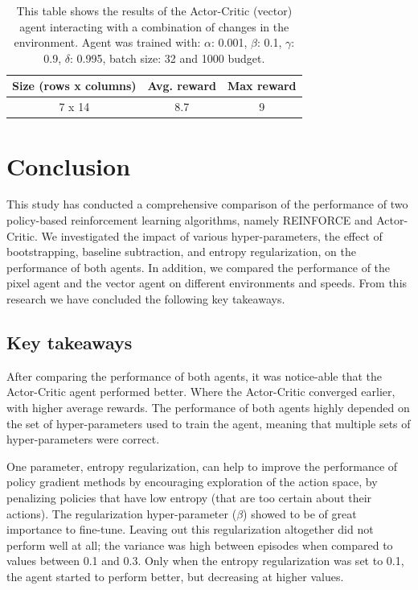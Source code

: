 \documentclass{article}
\begin{document}
\begin{table}[htbp]
    \centering
    \begin{tabular}{|c|c|c|}
        \hline
        \textbf{Size (rows x columns)} & \textbf{Avg. reward} & \textbf{Max reward} \\
        \hline
        7 x 14                & 8.7         & 9    \\ 
        \hline              
    \end{tabular}
    \caption{This table shows the results of the Actor-Critic (vector) agent interacting with a combination of changes in the environment. 
    Agent was trained with: $\alpha$: 0.001, $\beta$: 0.1, $\gamma$: 0.9, $\delta$: 0.995, batch size: 32 and 1000 budget. }
    \label{tab:Vector-comb}
\end{table}


\section{Conclusion}
\label{Conclusion}

This study has conducted a comprehensive comparison of the performance of two policy-based reinforcement learning algorithms, namely REINFORCE and Actor-Critic.
We investigated the impact of various hyper-parameters, the effect of bootstrapping, baseline subtraction, and entropy regularization, on the performance of both agents. 
In addition, we compared the performance of the pixel agent and the vector agent on different environments and speeds. 
From this research we have concluded the following key takeaways.

\subsection{Key takeaways} %
\label{C-Takeaways}
After comparing the performance of both agents, it was notice-able that the Actor-Critic agent performed better. 
Where the Actor-Critic converged earlier, with higher average rewards.
The performance of both agents highly depended on the set of hyper-parameters used to train the agent, meaning that multiple sets of hyper-parameters were correct. 

One parameter, entropy regularization, can help to improve the performance of policy gradient methods by encouraging exploration of the action space, by penalizing policies that have low entropy (that are too certain about their actions).
The regularization hyper-parameter ($\beta$) showed to be of great importance to fine-tune. 
Leaving out this regularization altogether did not perform well at all; the variance was high between episodes when compared to values between 0.1 and 0.3. 
Only when the entropy regularization was set to 0.1, the agent started to perform better, but decreasing at higher values.
\end{document}
